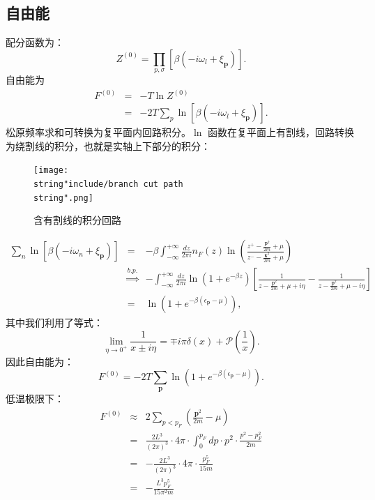 \documentclass[10pt,UTF8]{ctexart}
\begin{document}
\subsection*{自由能}
\noindent
配分函数为：
\begin{equation}
	Z^{\left(0\right)}=\prod_{p,\sigma}\left[\beta(-i\omega_{l}+\xi_{\bm p})\right].
\end{equation}
自由能为
\begin{eqnarray}
	F^{(0)} & = & -T \ln Z^{(0)} \\
 	& = & -2 T \sum_{p} \ln\left[\beta(-i\omega_{l}+\xi_{\bm p})\right].
\end{eqnarray}
松原频率求和可转换为复平面内回路积分。$\ln$ 函数在复平面上有割线，回路转换为绕割线的积分，也就是实轴上下部分的积分：
\begin{figure}[H]
\begin{centering}
\texttt{[image: \\string"include/branch cut path\\string".png]}
\par\end{centering}
\caption{含有割线的积分回路}
\end{figure}
\begin{eqnarray}
	\sum_{n} \ln\left[\beta(-i\omega_n+\xi_{\bm p})\right]
	& = & -\beta\int_{-\infty}^{+\infty}\frac{dz}{2\pi i}n_{F}\left(z\right)\ln\left(\frac{z^{+}-\frac{\bm{p}^{2}}{2m}+\mu}{z^{-}-\frac{\bm{k}^{2}}{2m}+\mu}\right)\\
 	& \stackrel{b.p.}{\Longrightarrow} & -\int_{-\infty}^{+\infty}\frac{dz}{2\pi i}\ln\left(1+e^{-\beta z}\right)\left[\frac{1}{z-\frac{\bm{p}^{2}}{2m}+\mu+i\eta}-\frac{1}{z-\frac{\bm{p}^{2}}{2m}+\mu-i\eta}\right]\\
 	& = & \ln\left(1+e^{-\beta\left(\epsilon_{\bm{p}}-\mu\right)}\right),
\end{eqnarray}
其中我们利用了等式：
\begin{equation}
	\lim_{\eta\rightarrow0^{+}}\frac{1}{x\pm i\eta}=\mp i\pi\delta\left(x\right)+\mathcal{P}\left(\frac{1}{x}\right).
\end{equation}
因此自由能为：
\begin{equation}
	F^{\left(0\right)}=-2T\sum_{\bm{p}}\ln\left(1+e^{-\beta\left(\epsilon_{\bm{p}}-\mu\right)}\right).
\end{equation}
低温极限下：
\begin{eqnarray}
	F^{\left(0\right)} & \approx & 2\sum_{p<p_{F}}\left(\frac{\bm{p}^{2}}{2m}-\mu\right)\\
 	& = & \frac{2L^{3}}{\left(2\pi\right)^{3}}\cdot4\pi\cdot\int_{0}^{p_F}dp\cdot p^{2}\cdot\frac{p^{2}-p_F^{2}}{2m}\\
 	& = & -\frac{2L^{3}}{\left(2\pi\right)^{3}}\cdot4\pi\cdot\frac{p_F^{5}}{15m}\\
 	& = & -\frac{L^{3}p_F^{5}}{15\pi^{2}m}
\end{eqnarray}
\end{document}
